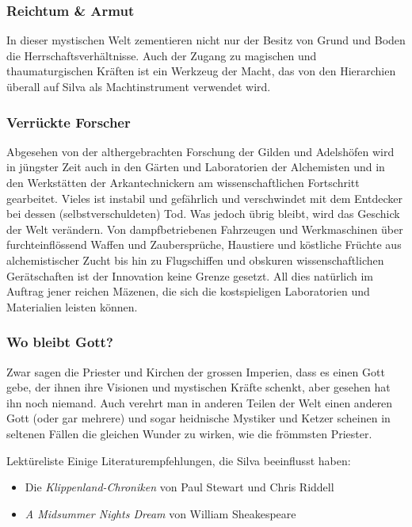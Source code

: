 \documentclass[10pt,twoside,twocolumn,openany]{book}
\begin{document}
\subsubsection{Reichtum \& Armut}
In dieser mystischen Welt zementieren nicht nur der Besitz von Grund und Boden die Herrschaftsverhältnisse. Auch der Zugang zu magischen und thaumaturgischen Kräften ist ein Werkzeug der Macht, das von den Hierarchien überall auf Silva als Machtinstrument verwendet wird.


\subsubsection{Verrückte Forscher}
Abgesehen von der althergebrachten Forschung der Gilden und Adelshöfen wird in jüngster Zeit auch in den Gärten und Laboratorien der Alchemisten und in den Werkstätten der Arkantechnickern am wissenschaftlichen Fortschritt gearbeitet. Vieles ist instabil und gefährlich und verschwindet mit dem Entdecker bei dessen (selbstverschuldeten) Tod. Was jedoch übrig bleibt, wird das Geschick der Welt verändern. Von dampfbetriebenen Fahrzeugen und Werkmaschinen über furchteinflössend Waffen und Zaubersprüche, Haustiere und köstliche Früchte aus alchemistischer Zucht bis hin zu Flugschiffen und obskuren wissenschaftlichen Gerätschaften ist der Innovation keine Grenze gesetzt. All dies natürlich im Auftrag jener reichen Mäzenen, die sich die kostspieligen Laboratorien und Materialien leisten können.

\subsubsection{Wo bleibt Gott?}
Zwar sagen die Priester und Kirchen der grossen Imperien, dass es einen Gott gebe, der ihnen ihre Visionen und mystischen Kräfte schenkt, aber gesehen hat ihn noch niemand. Auch verehrt man in anderen Teilen der Welt einen anderen Gott (oder gar mehrere) und sogar heidnische Mystiker und Ketzer scheinen in seltenen Fällen die gleichen Wunder zu wirken, wie die frömmsten Priester.

\begin{table}[h]
	\begin{commentbox}{Lektüreliste}
		Einige Literaturempfehlungen, die Silva beeinflusst haben:
		\begin{itemize}
			\item Die \emph{Klippenland-Chroniken} von Paul Stewart und Chris Riddell
			\item \emph{A Midsummer Nights Dream} von William Sheakespeare
		\end{itemize}
	\end{commentbox}
\end{table}
\end{document}
